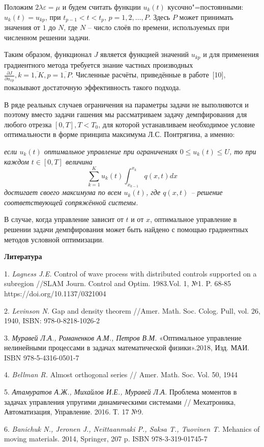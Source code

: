 Положим $2\lambda\varepsilon=\mu$ и будем считать функции $u_k(t)$ кусочно"=постоянными: $u_k(t)=u_{kp}$, при $t_{p-1}<t<t_p$, $p=1,2,\dots,P$. Здесь $P$ может принимать значения от $1$ до $N$, где $N$ -- число слоёв по времени, используемых при численном решении задачи.

Таким образом, функционал $J$ является функцией значений $u_{kp}$ и для применения градиентного метода требуется знание частных производных $\frac{\partial J}{\partial u_{xp}}, k=\overline{1,K}, p=\overline{1,P}.$ Численные расчёты, приведённые в работе~[10], показывают достаточную эффективность такого подхода.

В ряде реальных случаев ограничения на параметры задачи не выполняются и поэтому вместо задачи гашения мы рассматриваем задачу демпфирования для любого отрезка $[0,T], T<T_0$, для которой устанавливаем необходимое условие оптимальности в форме принципа максимума Л.С. Понтрягина, а именно:

 {\it если $u_k(t)$ оптимальное управление при ограничениях
	$0\leq u_k(t)\leq U$, то при каждом $t\in[0,T]$ величина
	$$\sum_{k=1}^{K}u_k(t)\int_{x_{k-1}}^{x_k}q\left(x,t\right)dx$$
	достигает своего максимума по всем $u_k(t)$, где $q(x,t)$ -- решение соответствующей сопряжённой системы.
}

В случае, когда управление зависит от $t$ и от $x$, оптимальное управление в решении задачи демпфирования может быть найдено с помощью градиентных методов условной оптимизации.

\smallskip \centerline {\bf Литература} \nopagebreak

1. {\it Lagness J.E.} Control of wave process with distributed controls supported on a subregion //SLAM Journ. Control and Optim. 1983.Vol. 1, №1. P. 68-85 https://doi.org/10.1137/0321004

2. {\it Levinson N.} Gap and density theorem //Amer. Math. Soc. Colog. Pull, vol. 26, 1940, ISBN: 978-0-8218-1026-2

3. {\it Муравей Л.А., Романенков А.М., Петров В.М.} «Оптимальное управление нелинейными процессами в задачах математической физики».2018, Изд. МАИ. ISBN 978-5-4316-0501-7

4. {\it Bellman R.} Almost orthogonal series // Amer. Math. Soc. Vol. 50, 1944

5.  {\it Атамуратов А.Ж., Михайлов И.Е., Муравей Л.А.} Проблема моментов в задачах управления упругими динамическими системами // Мехатроника, Автоматизация, Управление. 2016. Т. 17 №9.

6. {\it Banichuk N., Jeronen J., Neittaanmaki P., Saksa T., Tuovinen T.} Mehanics of moving materials. 2014, Springer, 207 p. ISBN 978-3-319-01745-7

